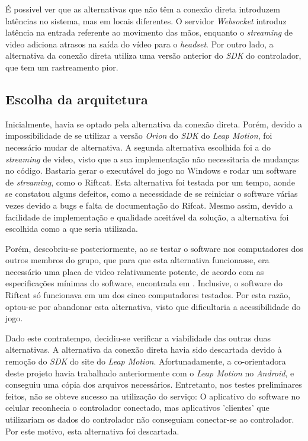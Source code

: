 \begin{quadro}[htb]
	\legend{\fonteAP}
\label{tabela:alternativas-arquiteturas}
\end{quadro}

É possivel ver que as alternativas que não têm a conexão direta 
introduzem latências no sistema, mas em locais diferentes. 
O servidor \textit{Websocket} introduz latência na entrada 
referente ao movimento das mãos, enquanto o \textit{streaming} 
de video adiciona atrasos na saída do vídeo para o \textit{headset}. 
Por outro lado, a alternativa da conexão direta utiliza uma 
versão anterior do \textit{SDK} do controlador, que tem um 
rastreamento pior.

\subsection{Escolha da arquitetura}\label{subsec-arquitetura-escolha}

Inicialmente, havia se optado pela alternativa da conexão direta. Porém, devido
a impossibilidade de se utilizar a versão \textit{Orion} do \textit{SDK} do 
\textit{Leap Motion}, foi necessário mudar de alternativa. A segunda alternativa 
escolhida foi a do \textit{streaming} de video, visto que a 
sua implementação não necessitaria de mudanças no código. Bastaria gerar 
o executável do jogo no Windows e rodar um software de \textit{streaming}, como o 
Riftcat. Esta alternativa foi testada por um tempo, aonde se constatou
alguns defeitos, como a necessidade de se reiniciar o software várias vezes 
devido a bugs e falta de documentação do Rifcat. Mesmo assim, devido a facilidade
de implementação e qualidade aceitável da solução, a alternativa foi escolhida
como a que seria utilizada.

Porém, descobriu-se posteriormente, ao se testar o software nos computadores
dos outros membros do grupo, que para que esta alternativa funcionasse, 
era necessário uma placa de video relativamente potente, de acordo com 
as especificações mínimas do software, encontrada em
\cite{riftcat:2016:requirements}. Inclusive, o software do Riftcat só 
funcionava em um dos cinco computadores testados. Por esta razão, optou-se 
por abandonar esta alternativa, visto que dificultaria a acessibilidade do jogo.

Dado este contratempo, decidiu-se verificar a viabilidade das outras duas 
alternativas. A alternativa da conexão direta havia sido descartada devido
à remoção do \textit{SDK} do site do \textit{Leap Motion}. 
Afortunadamente, a co-orientadora 
deste projeto havia trabalhado anteriormente com o \textit{Leap Motion} 
no \textit{Android}, e conseguiu uma cópia dos arquivos necessários. 
Entretanto, nos testes preliminares feitos, não se obteve sucesso na 
utilização do serviço: O aplicativo do software no celular reconhecia o 
controlador conectado, mas aplicativos 'clientes' que utilizariam os 
dados do controlador não conseguiam conectar-se ao controlador. Por este 
motivo, esta alternativa foi descartada.

